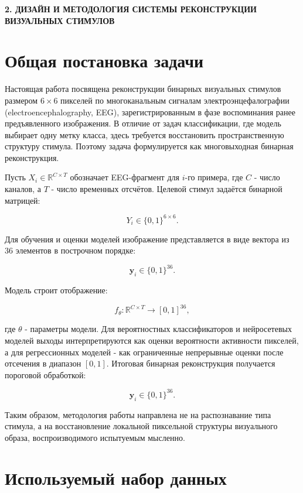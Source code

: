 \newpage
\begin{center}
  \parbox{0.95\textwidth}{\centering\textbf{\large 2. ДИЗАЙН И МЕТОДОЛОГИЯ СИСТЕМЫ РЕКОНСТРУКЦИИ ВИЗУАЛЬНЫХ СТИМУЛОВ}}
\end{center}

\section{Общая постановка задачи}

Настоящая работа посвящена реконструкции бинарных визуальных стимулов размером
$6 \times 6$ пикселей по многоканальным сигналам электроэнцефалографии
(electroencephalography, EEG), зарегистрированным в фазе воспоминания ранее
предъявленного изображения. В отличие от задач классификации, где модель
выбирает одну метку класса, здесь требуется восстановить пространственную
структуру стимула. Поэтому задача формулируется как многовыходная бинарная
реконструкция.

Пусть $X_i \in \mathbb{R}^{C \times T}$ обозначает EEG-фрагмент для $i$-го
примера, где $C$ - число каналов, а $T$ - число временных отсчётов. Целевой
стимул задаётся бинарной матрицей:

$$
Y_i \in \{0,1\}^{6 \times 6}.
$$

Для обучения и оценки моделей изображение представляется в виде вектора из 36
элементов в построчном порядке:

$$
\mathbf{y}_i \in \{0,1\}^{36}.
$$

Модель строит отображение:

$$
f_\theta: \mathbb{R}^{C \times T} \rightarrow [0,1]^{36},
$$

где $\theta$ - параметры модели. Для вероятностных классификаторов и
нейросетевых моделей выходы интерпретируются как оценки вероятности активности
пикселей, а для регрессионных моделей - как ограниченные непрерывные оценки
после отсечения в диапазон $[0,1]$. Итоговая бинарная реконструкция получается
пороговой обработкой:

$$
\hat{\mathbf{y}}_i \in \{0,1\}^{36}.
$$

Таким образом, методология работы направлена не на распознавание типа стимула,
а на восстановление локальной пиксельной структуры визуального образа,
воспроизводимого испытуемым мысленно.

\section{Используемый набор данных}

